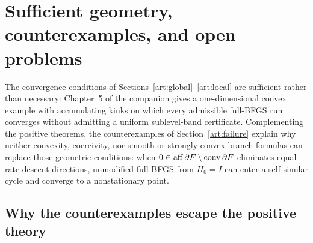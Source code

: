 \section{Sufficient geometry, counterexamples, and open problems}\label{art:verification}

The convergence conditions of Sections~\ref{art:global}--\ref{art:local} are
sufficient rather than necessary: Chapter~5 of the companion gives a
one-dimensional convex example with accumulating kinks on which every admissible
full-BFGS run converges without admitting a uniform sublevel-band certificate.
Complementing the positive theorems, the counterexamples of
Section~\ref{art:failure} explain why neither convexity, coercivity, nor smooth
or strongly convex branch formulas can replace those geometric conditions: when
$0\in\operatorname{aff}\partial F\setminus\operatorname{conv}\partial F$ eliminates equal-rate descent
directions, unmodified full BFGS from $H_0=I$ can enter a self-similar cycle and
converge to a nonstationary point.

\subsection{Why the counterexamples escape the positive theory}

